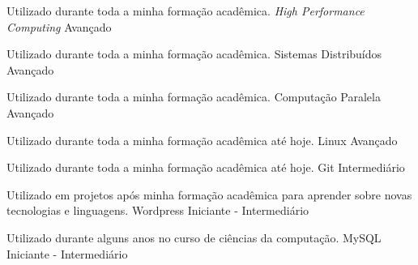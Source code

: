 \begin{cventries}

  \cventry
  {Utilizado durante toda a minha formação acadêmica.}
  {\textit{High Performance Computing}}
  {Avançado}
  {}
  {}

  \cventry
  {Utilizado durante toda a minha formação acadêmica.}
  {Sistemas Distribuídos}
  {Avançado}
  {}
  {}

  \cventry
  {Utilizado durante toda a minha formação acadêmica.}
  {Computação Paralela}
  {Avançado}
  {}
  {}

  \cventry
  {Utilizado durante toda a minha formação acadêmica até hoje.}
  {Linux}
  {Avançado}
  {}
  {}

  \cventry
  {Utilizado durante toda a minha formação acadêmica até hoje.}
  {Git}
  {Intermediário}
  {}
  {}

  \cventry
  {Utilizado em projetos após minha formação acadêmica para aprender sobre
  novas tecnologias e linguagens.}
  {Wordpress} %
  {Iniciante - Intermediário} %
  {}
  {}

  \cventry
  {Utilizado durante alguns anos no curso de ciências da computação.}
  {MySQL} %
  {Iniciante - Intermediário} %
  {}
  {}

\end{cventries}
